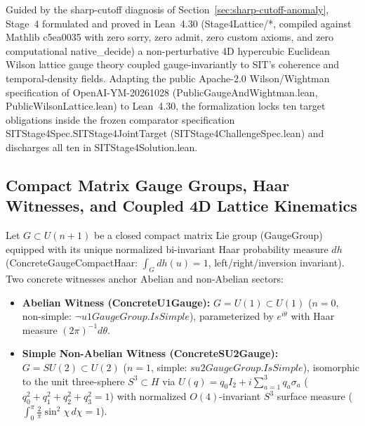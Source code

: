 \documentclass[american,11pt,letterpaper]{article}
\def\mathbb#1{#1}%
\def\mathrm#1{#1}%
\def\texttt#1{#1}%
\begin{document}
Guided by the sharp-cutoff diagnosis of Section~\ref{sec:sharp-cutoff-anomaly}, Stage~4 formulated and proved in Lean~4.30 (\texttt{Stage4Lattice/*}, compiled against Mathlib \texttt{c5ea0035} with zero \texttt{sorry}, zero \texttt{admit}, zero custom axioms, and zero computational \texttt{native\_decide}) a non-perturbative 4D hypercubic Euclidean Wilson lattice gauge theory coupled gauge-invariantly to SIT's coherence and temporal-density fields. Adapting the public Apache-2.0 Wilson/Wightman specification of \texttt{OpenAI-YM-20261028} (\texttt{Public\allowbreak{}Gauge\allowbreak{}And\allowbreak{}Wightman.\allowbreak{}lean}, \texttt{Public\allowbreak{}Wilson\allowbreak{}Lattice.\allowbreak{}lean}) to Lean~4.30, the formalization locks ten target obligations inside the frozen comparator specification \texttt{SITStage4\allowbreak{}Spec.\allowbreak{}SITStage4\allowbreak{}Joint\allowbreak{}Target} (\texttt{SITStage4\allowbreak{}Challenge\allowbreak{}Spec.\allowbreak{}lean}) and discharges all ten in \texttt{SITStage4\allowbreak{}Solution.\allowbreak{}lean}.

\subsection{Compact Matrix Gauge Groups, Haar Witnesses, and Coupled 4D Lattice Kinematics}

Let $G \subset U(n+1)$ be a closed compact matrix Lie group (\texttt{GaugeGroup}) equipped with its unique normalized bi-invariant Haar probability measure $dh$ (\texttt{Concrete\allowbreak{}Gauge\allowbreak{}Compact\allowbreak{}Haar}: $\int_G dh(u) = 1$, left/right/inversion invariant). Two concrete witnesses anchor Abelian and non-Abelian sectors:
\begin{itemize}
  \item \textbf{Abelian Witness (\texttt{ConcreteU1Gauge}):} $G = U(1) \subset U(1)$ ($n=0$, non-simple: $\neg\mathrm{u1GaugeGroup.IsSimple}$), parameterized by $e^{i\theta}$ with Haar measure $(2\pi)^{-1}d\theta$.
  \item \textbf{Simple Non-Abelian Witness (\texttt{ConcreteSU2Gauge}):} $G = SU(2) \subset U(2)$ ($n=1$, simple: $\mathrm{su2GaugeGroup.IsSimple}$), isomorphic to the unit three-sphere $S^3 \subset \mathbb{H}$ via $U(q) = q_0 I_2 + i\sum_{a=1}^3 q_a\sigma_a$ ($q_0^2 + q_1^2 + q_2^2 + q_3^2 = 1$) with normalized $O(4)$-invariant $S^3$ surface measure ($\int_0^\pi \frac{2}{\pi}\sin^2\chi\,d\chi = 1$).
\end{itemize}
\end{document}
